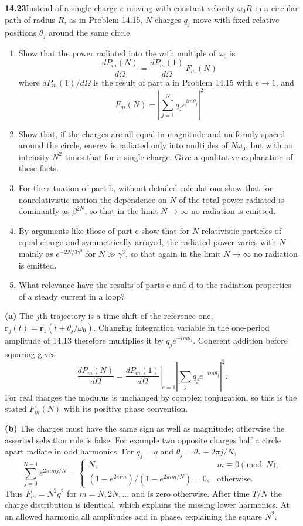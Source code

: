 \par\bigskip
\noindent\textbf{14.23}\quad Instead of a single charge $e$ moving with constant velocity $\omega_{0}R$ in a circular path of radius $R$, as in Problem 14.15, $N$ charges $q_{j}$ move with fixed relative positions $\theta_{j}$ around the same circle.
\begin{enumerate}
\item[(a)] Show that the power radiated into the $m$th multiple of $\omega_{0}$ is
\[
\frac{dP_{m}(N)}{d\Omega}=\frac{dP_{m}(1)}{d\Omega}\,F_{m}(N)
\]
where $dP_{m}(1)/d\Omega$ is the result of part a in Problem 14.15 with $e\to1$, and
\[
F_{m}(N)=\left|\sum_{j=1}^{N}q_{j}e^{im\theta_{j}}\right|^{2}
\]
\item[(b)] Show that, if the charges are all equal in magnitude  and uniformly spaced around the circle, energy is radiated only into multiples of $N\omega_{0}$, but with an intensity $N^{2}$ times that for a single charge. Give a qualitative explanation of these facts.
\item[(c)] For the situation of part b, without detailed calculations show that for nonrelativistic motion the dependence on $N$ of the total power radiated is dominantly as $\beta^{2N}$, so that in the limit $N\to\infty$ no radiation is emitted.
\item[(d)] By arguments like those of part c show that for $N$ relativistic particles of equal charge and symmetrically arrayed, the radiated power varies with $N$ mainly as $e^{-2N/3\gamma^{3}}$ for $N\gg\gamma^{3}$,  so that again in the limit $N\to\infty$ no radiation is emitted.
\item[(e)] What relevance have the results of parts c and d to the radiation properties of a steady current in a loop?
\end{enumerate}
\solution

\textbf{(a)} The $j$th trajectory is a time shift of the reference one,
$\mathbf r_j(t)=\mathbf r_1(t+\theta_j/\omega_0)$.
Changing integration variable in the one-period amplitude of 14.13
therefore multiplies it by $q_je^{-im\theta_j}$.
Coherent addition before squaring gives
\[
\frac{dP_m(N)}{d\Omega}=\left.\frac{dP_m(1)}{d\Omega}\right|_{e=1}
\left|\sum_jq_je^{-im\theta_j}\right|^2.
\]
For real charges the modulus is unchanged by complex conjugation, so
this is the stated $F_m(N)$ with its positive phase convention.

\textbf{(b)} The charges must have the same sign as well as magnitude;
otherwise the asserted selection rule is false. For example two
opposite charges half a circle apart radiate in odd harmonics.
For $q_j=q$ and $\theta_j=\theta_*+2\pi j/N$,
\[
\sum_{j=0}^{N-1}e^{2\pi imj/N}
=\begin{cases}N,&m\equiv0\pmod N,\\
(1-e^{2\pi im})/(1-e^{2\pi im/N})=0,&\text{otherwise}.
\end{cases}
\]
Thus $F_m=N^2q^2$ for $m=N,2N,\ldots$ and is zero otherwise.
After time $T/N$ the charge distribution is identical, which explains
the missing lower harmonics. At an allowed harmonic all amplitudes
add in phase, explaining the square $N^2$.

